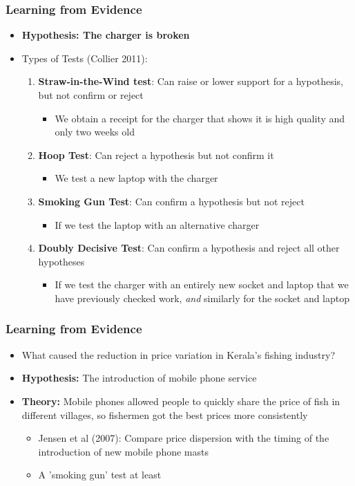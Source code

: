 \documentclass[xcolor=x11names,compress]{beamer}\usepackage[]{graphicx}\usepackage[]{color}
\renewcommand{\(}{\begin{columns}}
\renewcommand{\)}{\end{columns}}
\newcommand{\<}[1]{\begin{column}{#1}}
\renewcommand{\>}{\end{column}}
\begin{document}
\begin{frame}
\frametitle{Learning from Evidence}
\begin{itemize}
\item \textbf{Hypothesis: The charger is broken}
\pauae
\item Types of Tests (Collier 2011):
\pause
\begin{enumerate}
\item \textbf{Straw-in-the-Wind test}: Can raise or lower support for a hypothesis, but not confirm or reject
\pause
\begin{itemize}
\item We obtain a receipt for the charger that shows it is high quality and only two weeks old
\end{itemize}
\pause
\item \textbf{Hoop Test}: Can reject a hypothesis but not confirm it
\pause
\begin{itemize}
\item We test a new laptop with the charger
\end{itemize}
\pause
\item \textbf{Smoking Gun Test}: Can confirm a hypothesis but not reject
\pause
\begin{itemize}
\item If we test the laptop with an alternative charger
\end{itemize}
\pause
\item \textbf{Doubly Decisive Test}: Can confirm a hypothesis and reject all other hypotheses
\pause
\begin{itemize}
\item If we test the charger with an entirely new socket and laptop that we have previously checked work, \textit{and} similarly for the socket and laptop
\end{itemize}
\end{enumerate}
\end{itemize}
\end{frame}

\begin{frame}
\frametitle{Learning from Evidence}
\begin{itemize}
\item What caused the reduction in price variation in Kerala's fishing industry?
\item \textbf{Hypothesis:} The introduction of mobile phone service
\item \textbf{Theory:} Mobile phones allowed people to quickly share the price of fish in different villages, so fishermen got the best prices more consistently
\begin{itemize}
\item Jensen et al (2007): Compare price dispersion with the timing of the introduction of new mobile phone masts
\item A 'smoking gun' test at least
\end{itemize}
\end{itemize}
\end{frame}
\end{document}
